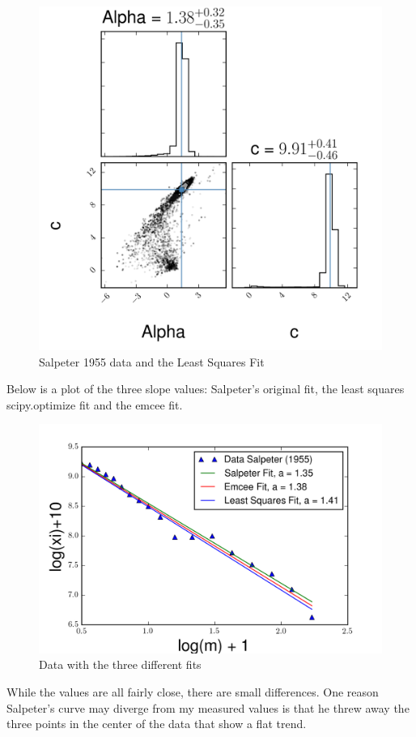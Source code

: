 \documentclass[english,11pt]{article}
\begin{document}
\begin{figure}[H]
\centering
\caption{Salpeter 1955 data and the Least Squares Fit}
\includegraphics[scale = 0.6]{corner_plot_emcee_prob3.png}
\end{figure}

Below is a plot of the three slope values: Salpeter's original fit, the least squares scipy.optimize fit and the emcee fit.
\begin{figure}[H]
\centering
\caption{Data with the three different fits}
\includegraphics[scale = 0.8]{fit_comparison_power_law_prob3.png}
\end{figure}
While the values are all fairly close, there are small differences. One reason Salpeter's curve may diverge from my measured values is that he threw away the three points in the center of the data that show a flat trend.
\end{document}
